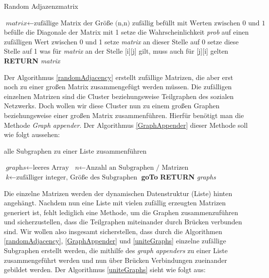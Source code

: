 \begin{algorithm}
\caption{Random Adjazenzmatrix}\label{randomAdjacency}
\begin{algorithmic}[1]
\State $\textit{matrix} \gets \text{zufällige Matrix der Größe (n,n) zufällig befüllt mit Werten zwischen 0 und 1}$
\State befülle die Diagonale der Matrix mit 1
\State setze die Wahrscheinlichkeit \textit{prob} auf einen zufälligen Wert zwischen 0 und 1
\State setze \textit{matrix} an dieser Stelle auf 0
\Else 
\State setze diese Stelle auf 1
\EndIf
\EndFor
\EndFor
{}
\State was für \textit{matrix} an der Stelle [i][j] gilt, muss auch für [j][i] gelten
\State \textbf{RETURN} \textit{matrix}
\EndFor
\EndProcedure
\end{algorithmic}
\end{algorithm}

Der Algorithmus \ref{randomAdjacency} erstellt zufällige Matrizen, die aber erst noch zu einer großen Matrix zusammengefügt werden müssen. Die zufälligen einzelnen Matrizen sind die Cluster beziehungsweise Teilgraphen des sozialen Netzwerks. Doch wollen wir diese Cluster nun zu einem großen Graphen beziehungsweise einer großen Matrix zusammenführen. Hierfür benötigt man die Methode \textit{Graph appender}. Der Algorithmus \ref{GraphAppender} dieser Methode soll wie folgt aussehen: 

\begin{algorithm}
\caption{alle Subgraphen zu einer Liste zusammenführen}\label{GraphAppender}
\begin{algorithmic}[1]
\State $\textit{graphs} \gets \text{leeres Array}$
\State $\textit{n} \gets \text{Anzahl an Subgraphen / Matrizen}$
\State $\textit{k} \gets \text{zufälliger integer, Größe des Subgraphen}$
\State \textbf{goTo} 
\State {} 
\State \textbf{RETURN} \textit{graphs}
\EndFor
\EndProcedure
\end{algorithmic}
\end{algorithm}

\newpage
Die einzelne Matrizen werden der dynamischen Datenstruktur (Liste) hinten angehängt.
Nachdem nun eine Liste mit vielen zufällig erzeugten Matrizen generiert ist, fehlt lediglich eine Methode, um die Graphen zusammenzuführen und sicherzustellen, dass die Teilgraphen miteinander durch Brücken verbunden sind. Wir wollen also insgesamt sicherstellen, dass durch die Algorithmen \ref{randomAdjacency}, \ref{GraphAppender} und \ref{uniteGraphs} einzelne zufällige Subgraphen erstellt werden, die mithilfe des \textit{graph appenders} zu einer Liste zusammengeführt werden und nun über Brücken Verbindungen zueinander gebildet werden. Der Algorithmus \ref{uniteGraphs} sieht wie folgt aus:

